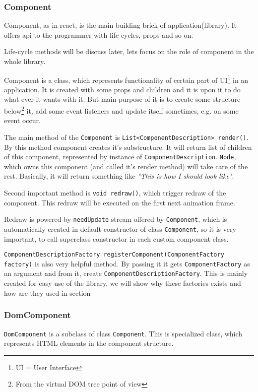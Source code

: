 \documentclass[oneside, 12pt]{book}
\begin{document}
    \subsubsection{Component}\label{subsubsec:our-architecture-core-component}
      Component, as in react, is the main building brick of application(library). 
      It offers api to the programmer with life-cycles, props and so on. 

      Life-cycle methods will be discuss later, lets focus on the role of component in the whole library.

      Component is a class, which represents functionality of certain part of UI\footnote{UI = User Interface} in an application.
      It is created with some props and children and it is upon it to do what ever it wants with it. 
      But main purpose of it is to create some structure below\footnote{From the virtual DOM tree point of view} it, 
      add some event listeners and update itself sometimes, e.g. on some event occur.

      The main method of the \texttt{Component} is \texttt{List<ComponentDescription> render()}. 
      By this method component creates it's substructure.
      It will return list of children of this component, represented by instance of \texttt{ComponentDescription}. 
      \texttt{Node}, which owns this component (and called it's render method) will take care of the rest.
      Basically, it will return something like \textit{"This is how I should look like"}.

      Second important method is \texttt{void redraw()}, which trigger redraw of the component. 
      This redraw will be executed on the first next animation frame. 

      Redraw is powered by \texttt{needUpdate} stream offered by \texttt{Component}, 
      which is automatically created in default constructor of class \texttt{Component}, 
      so it is very important, to call superclass constructor in each custom component class.

      \texttt{ComponentDescriptionFactory registerComponent(ComponentFactory factory)} is also very helpful method. 
      By passing it it gets \texttt{ComponentFactory} as an argument and from it, create \texttt{ComponentDescriptionFactory}. 
      This is mainly created for easy use of the library, we will show why these factories exists and how are they used in section~
      
    \subsubsection{DomComponent}\label{subsubsec:our-architecture-core-dom-component}
      \texttt{DomComponent} is a subclass of class \texttt{Component}. 
      This is specialized class, which represents HTML elements in the component structure.
\end{document}
